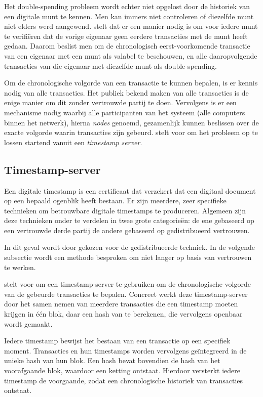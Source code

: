 	Het double-spending probleem wordt echter niet opgelost door de historiek van een digitale munt te kennen. Men kan immers niet controleren of diezelfde munt niet elders werd aangewend. \textcite{Nakamoto2008} stelt dat er een manier nodig is om voor iedere munt te verifiëren dat de vorige eigenaar geen eerdere transacties met de munt heeft gedaan. Daarom beslist men om de chronologisch eerst-voorkomende transactie van een eigenaar met een munt als valabel te beschouwen, en alle daaropvolgende transacties van die eigenaar met diezelfde munt als double-spending.~\autocite{Nakamoto2008}
			
	Om de chronologische volgorde van een transactie te kunnen bepalen, is er kennis nodig van alle transacties. Het publiek bekend maken van alle transacties is de enige manier om dit zonder vertrouwde partij te doen. Vervolgens is er een mechanisme nodig waarbij alle participanten van het systeem (alle computers binnen het netwerk), hierna \textit{nodes} genoemd, gezamenlijk kunnen beslissen over de exacte volgorde waarin transacties zijn gebeurd. \textcite{Nakamoto2008} stelt voor om het probleem op te lossen startend vanuit een \textit{timestamp server}. 
			
	\subsection{Timestamp-server}
	Een digitale timestamp is een certificaat dat verzekert dat een digitaal document op een bepaald ogenblik heeft bestaan. Er zijn meerdere, zeer specifieke technieken om betrouwbare digitale timestamps te produceren. Algemeen zijn deze technieken onder te verdelen in twee grote categorieën: de ene gebaseerd op een vertrouwde derde partij de andere gebaseerd op gedistribueerd vertrouwen. ~\autocite{Nakamoto2008}
	
	In dit geval wordt door \textcite{Nakamoto2008} gekozen voor de gedistribueerde techniek. In de volgende subsectie wordt een methode besproken om niet langer op basis van vertrouwen te werken.
	
	\textcite{Nakamoto2008} stelt voor om een timestamp-server te gebruiken om de chronologische volgorde van de gebeurde transacties te bepalen.  Concreet werkt deze timestamp-server door het samen nemen van meerdere transacties die een timestamp moeten krijgen in één blok, daar een hash van te berekenen, die vervolgens openbaar wordt gemaakt.
	
	Iedere timestamp bewijst het bestaan van een transactie op een specifiek moment. Transacties en hun timestamps worden vervolgens geïntegreerd in de unieke hash van hun blok. Een hash bevat bovendien de hash van het voorafgaande blok, waardoor een ketting ontstaat. Hierdoor versterkt iedere timestamp  de voorgaande, zodat een chronologische historiek van transacties ontstaat.~\autocite{Nakamoto2008}
	
